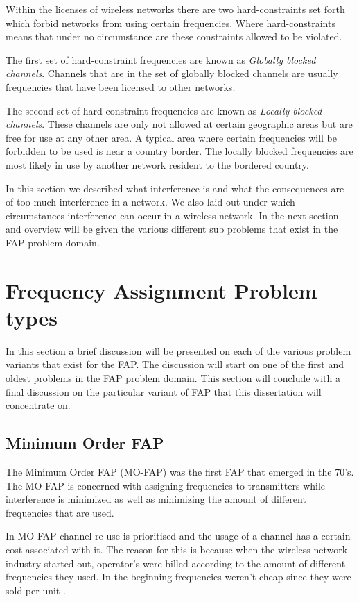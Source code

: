 Within the licenses of wireless networks there are two hard-constraints set forth which forbid networks from using certain frequencies. Where hard-constraints means that under no circumstance are these constraints allowed to be violated.

The first set of hard-constraint frequencies are known as \emph{Globally blocked channels}. Channels that are in the set of globally blocked channels are usually frequencies that have been licensed to other networks\cite{Eisenblatter,Karen2004,InterferenceOrientatedFAP}.

The second set of hard-constraint frequencies are known as \emph{Locally blocked channels}. These channels are only not allowed at certain geographic areas but are free for use at any other area\cite{Eisenblatter,Karen2004,InterferenceOrientatedFAP}. A typical area where certain frequencies will be forbidden to be used is near a country border\cite{Eisenblatter,Karen2004,InterferenceOrientatedFAP}. The locally blocked frequencies are most likely in use by another network resident to the bordered country.

In this section we described what interference is and what the consequences are of too much interference in a network. We also laid out under which circumstances interference can occur in a wireless network. In the next section and overview will be given the various different sub problems that exist in the FAP problem domain.

\section{Frequency Assignment Problem types}
\label{sec:FAPVariants}
In this section a brief discussion will be presented on each of the various problem variants that exist for the FAP. The discussion will start on one of the first and oldest problems in the FAP problem domain. This section will conclude with a final discussion on the particular variant of FAP that this dissertation will concentrate on.
\subsection{Minimum Order FAP}
The Minimum Order FAP (MO-FAP) was the first FAP that emerged in the 70's. The MO-FAP is concerned with assigning frequencies to transmitters while interference is minimized as well as minimizing the amount of different frequencies that are used. 

In MO-FAP channel re-use is prioritised and the usage of a channel has a certain cost associated with it. The reason for this is because when the wireless network industry started out, operator's were billed according to the amount of different frequencies they used. In the beginning frequencies weren't cheap since they were sold per unit \cite{Karen2004,MontemanniThesis}. 

